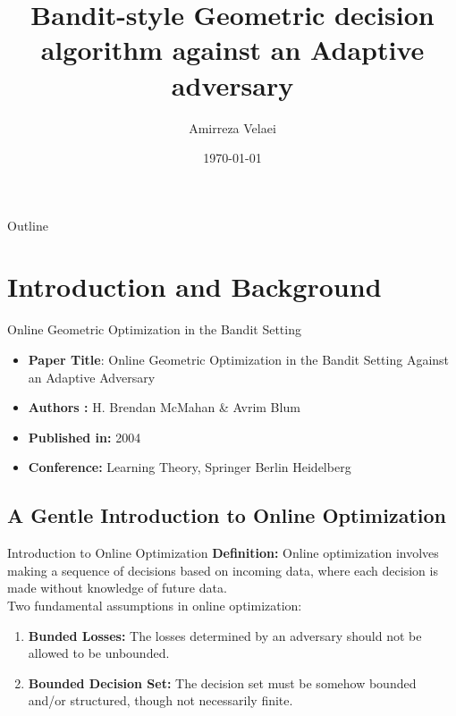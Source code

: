 \documentclass{beamer}
\title{Bandit-style Geometric decision algorithm against an Adaptive adversary}
\author{Amirreza Velaei}
\institute{Sharif University of Technology}
\date{\today}
\begin{document}
\begin{frame}
    \titlepage
\end{frame}

\begin{frame}{Outline}
    \tableofcontents
\end{frame}

\section{Introduction and Background}

\begin{frame}{Online Geometric Optimization in the Bandit Setting}
    \begin{itemize}
        \item
        \textbf{Paper Title}: Online Geometric Optimization in the Bandit 
        Setting Against an Adaptive Adversary \\
        \item \textbf{Authors :}  H. Brendan McMahan \& Avrim Blum
        \item \textbf{Published in:} 2004
        \item \textbf{Conference:} Learning Theory, Springer Berlin Heidelberg
    \end{itemize}

\end{frame}
\subsection{A Gentle Introduction to Online Optimization}
\begin{frame}{Introduction to Online Optimization}
    \textbf{Definition:} Online optimization involves making a sequence of decisions based on incoming data, where each decision is made without knowledge of future data. \\
    Two fundamental assumptions in online optimization:
    \begin{enumerate}
        \item \textbf{Bunded Losses:} The losses determined by an adversary should not be allowed to be unbounded.
        \item \textbf{Bounded Decision Set:}  The decision set must be somehow bounded and/or structured, though not necessarily finite.
    \end{enumerate}
\end{frame}
\end{document}
